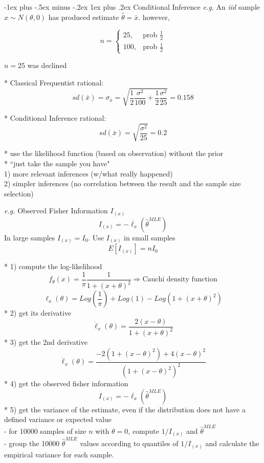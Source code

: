 \documentclass[10pt,landscape]{article}
\makeatletter
\renewcommand{\subsubsection}{\@startsection{subsubsection}{3}{0mm}%
                                {-1ex plus -.5ex minus -.2ex}%
                                {1ex plus .2ex}%
                                {\normalfont\small\bfseries}}
\makeatother
\begin{document}
\begin{multicols}{3}
\subsubsection{Conditional Inference}
\emph{e.g.} An \emph{iid} sample $x \sim N(\theta, 0)$ has produced estimate $\hat{\theta} = \bar{x}$. however,
\begin{multicols}{2}
$$
n = \begin{cases} 25, & \text{prob } \frac{1}{2} \\ 100, & \text{prob } \frac{1}{2} \end{cases}
$$

\pagebreak 
$n = 25$ was declined
\end{multicols}

* Classical Frequentist rational: \\
$$ sd(\bar{x}) = \sigma_{\bar{x}} = \sqrt{\frac{1}{2} \frac{\sigma^2}{100} + \frac{1}{2} \frac{\sigma^2}{25}} = 0.158 $$

* Conditional Inference rational: \\
$$ sd(\bar{x}) = \sqrt{\frac{\sigma^2}{25}} = 0.2 $$

* use the likelihood function (based on observation) without the prior \\
* ``just take the sample you have" \\

1) more relevant inferences (w/what really happened) \\
2) simpler inferences (no correlation between the result and the sample size selection)

\medskip
\emph{e.g.} Observed Fisher Information $I_{(x)}$
$$ I_{(x)} = -\ddot{\ell_x}(\hat{\theta}^{MLE}) $$
In large samples $I_{(x)} = I_0$. Use $I_{(x)}$ in small samples 
$$ E[I_{(x)}] = n I_0 $$ 

* 1) compute the log-likelihood \\
$$ f_{\theta}(x) = \frac{1}{\pi} \frac{1}{1 + (x + \theta)^2} \Rightarrow \text{Cauchi density function} $$
$$ \ell_x(\theta) = Log\left(\frac{1}{\pi}\right) + Log(1) - Log(1 + (x + \theta)^2) $$
* 2) get its derivative \\
$$ \dot{\ell}_x(\theta) = \frac{2(x - \theta)}{1 + (x + \theta)^2} $$
* 3) get the 2nd derivative \\
$$ \ddot{\ell}_x(\theta) = \frac{-2(1 + (x - \theta)^2) + 4(x - \theta)^2}{(1 + (x - \theta)^2)^2} $$
* 4) get the observed fisher information \\
$$ I_{(x)} = -\ddot{\ell_x}(\hat{\theta}^{MLE}) $$
* 5) get the variance of the estimate, even if the distribution does not have a defined variance or expected value \\
- for 10000 samples of size $n$ with $\theta = 0$, compute $1/I_{(x)}$ and $\hat{\theta}^{MLE}$ \\
- group the 10000 $\hat{\theta}^{MLE}$ values according to quantiles of $1/I_{(x)}$ and calculate the empirical variance for each sample.


\end{multicols}
\end{document}
